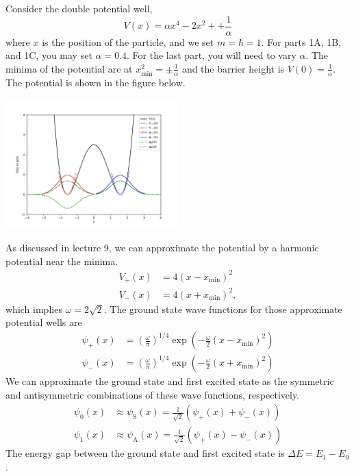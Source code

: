 Consider the double potential well,
\begin{equation}
  V(x) =  \alpha x^4  - 2x^2 + + \frac{1}{\alpha}
\end{equation}
where $x$ is the position of the particle, and we set $m=\hbar=1$.
For parts 1A, 1B, and 1C, you may set $\alpha = 0.4$.
For the last part, you will need to vary $\alpha$.
The minima of the potential are at $x_\mathrm{min}^2 = \pm\frac{1}{\alpha}$ and the barrier height is $V(0) = \frac{1}{\alpha}$.
The potential is shown in the figure below.
\begin{center}
  \includegraphics[width=0.5\textwidth]{V_all.pdf}
\end{center}

As discussed in lecture 9, we can approximate the potential by a harmonic potential near the minima.
\begin{align}
  V_+(x) & = 4(x-x_\mathrm{min})^2  \\
  V_-(x) & = 4(x+x_\mathrm{min})^2,
\end{align}
which implies $\omega = 2\sqrt{2}$.
The ground state wave functions for those approximate potential wells are
\begin{align}
  \psi_+(x) & = \left(\frac{\omega}{\pi}\right)^{1/4} \exp\left(- \frac{\omega}{2}(x-x_\mathrm{min})^2\right) \\
  \psi_-(x) & = \left(\frac{\omega}{\pi}\right)^{1/4} \exp\left(- \frac{\omega}{2}(x+x_\mathrm{min})^2\right)
\end{align}
We can approximate the ground state and first excited state as the symmetric and antisymmetric combinations of these wave functions, respectively.
\begin{align}
  \psi_0(x) & \approx \psi_\mathrm{S}(x) = \frac{1}{\sqrt{2}}\left ( \psi_+(x) + \psi_-(x) \right ) \\
  \psi_1(x) & \approx \psi_\mathrm{A}(x) = \frac{1}{\sqrt{2}}\left ( \psi_+(x) - \psi_-(x) \right )
\end{align}
The energy gap between the ground state and first excited state is $\Delta E = E_1 - E_0$.

